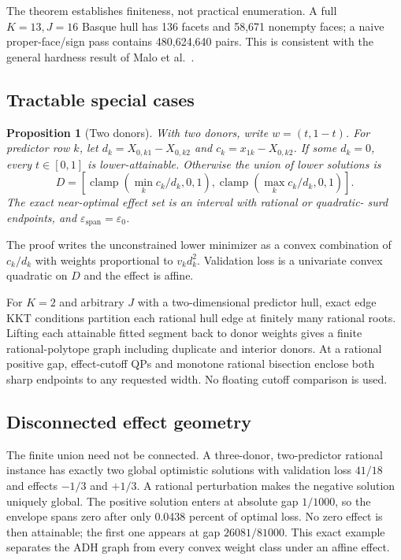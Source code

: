 \documentclass[10pt]{article}
\newtheorem{proposition}[theorem]{Proposition}
\theoremstyle{definition}
\newcommand{\eps}{\varepsilon}
\begin{document}
The theorem establishes finiteness, not practical enumeration.  A full
$K=13,J=16$ Basque hull has 136 facets and 58,671 nonempty faces; a naive
proper-face/sign pass contains 480,624,640 pairs.  This is consistent with the
general hardness result of Malo et al.~\cite{malo2024}.

\subsection{Tractable special cases}

\begin{proposition}[Two donors]\label{prop:twodonor}
With two donors, write $w=(t,1-t)$.  For predictor row $k$, let
$d_k=X_{0,k1}-X_{0,k2}$ and $c_k=x_{1k}-X_{0,k2}$.  If some $d_k=0$, every
$t\in[0,1]$ is lower-attainable.  Otherwise the union of lower solutions is
\[
 D=\left[\operatorname{clamp}\left(\min_k c_k/d_k,0,1\right),
          \operatorname{clamp}\left(\max_k c_k/d_k,0,1\right)\right].
\]
The exact near-optimal effect set is an interval with rational or quadratic-
surd endpoints, and $\eps_{\mathrm{span}}=\eps_0$.
\end{proposition}

The proof writes the unconstrained lower minimizer as a convex combination of
$c_k/d_k$ with weights proportional to $v_kd_k^2$.  Validation loss is a
univariate convex quadratic on $D$ and the effect is affine.

For $K=2$ and arbitrary $J$ with a two-dimensional predictor hull, exact edge
KKT conditions partition each rational hull edge at finitely many rational
roots.  Lifting each attainable fitted segment back to donor weights gives a
finite rational-polytope graph including duplicate and interior donors.  At a
rational positive gap, effect-cutoff QPs and monotone rational bisection enclose
both sharp endpoints to any requested width.  No floating cutoff comparison is
used.

\subsection{Disconnected effect geometry}

The finite union need not be connected.  A three-donor, two-predictor rational
instance has exactly two global optimistic solutions with validation loss
$41/18$ and effects $-1/3$ and $+1/3$.  A rational perturbation makes the
negative solution uniquely global.  The positive solution enters at absolute
gap $1/1000$, so the envelope spans zero after only 0.0438 percent of optimal
loss.  No zero effect is then attainable; the first one appears at gap
$26081/81000$.  This exact example separates the ADH graph from every convex
weight class under an affine effect.
\end{document}
